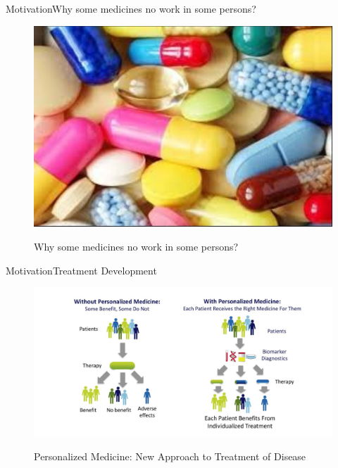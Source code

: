 \documentclass[10pt]{beamer}
\begin{document}
{%
\begin{frame}{Motivation}{Why some medicines no work in some persons?}
\begin{figure}[]
 \centering
    \includegraphics[width=\textwidth,height=0.6\textheight,keepaspectratio]{img/introduction/mot4.jpg}
    \label{img:mot2}
    \caption{Why some medicines no work in some persons?}
\end{figure}
\end{frame}

\begin{frame}{Motivation}{Treatment Development}
\begin{figure}[]
 \centering
    \includegraphics[width=\textwidth,height=0.7\textheight,keepaspectratio]{img/introduction/mot5.jpg}
    \label{img:mot2}
    \caption{Personalized Medicine: New Approach to Treatment of Disease}
\end{figure}
\end{frame}

}
\end{document}

